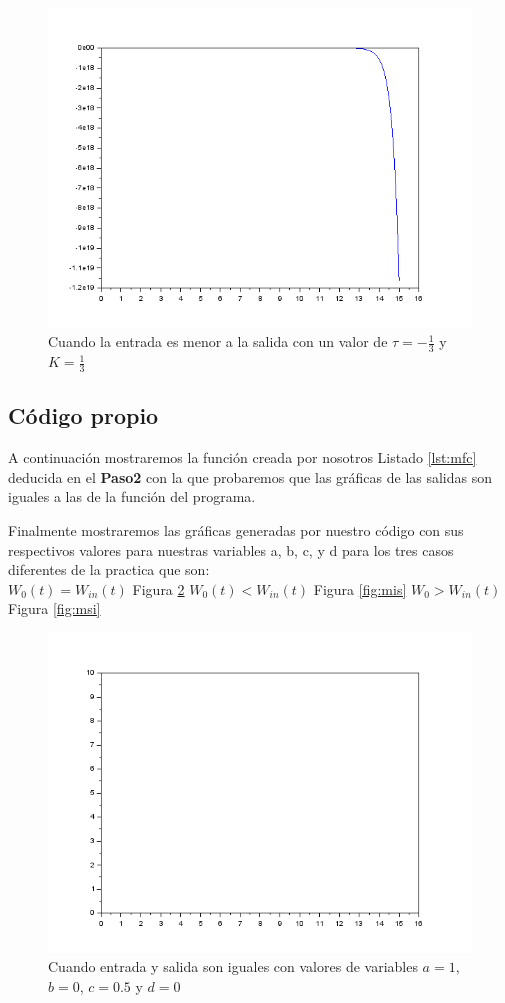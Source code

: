 \documentclass[letterpaper,10pt]{article}
\begin{document}
 \begin{figure}[h!]
 	\centering
 	\includegraphics[width=0.5\linewidth]{salin}
 	\caption{Cuando la entrada es menor a la salida con un valor de $\tau=-\frac{1}{3}$ y $K=\frac{1}{3}$}
 	\label{fig:salin}
 \end{figure}
 \FloatBarrier 
\subsection{Código propio}
A continuación mostraremos la función creada por nosotros Listado \ref{lst:mfc} deducida en el \textbf{Paso2} con la que probaremos que las gráficas de las salidas son iguales a las de la función del programa.
	 

Finalmente mostraremos las gráficas generadas por nuestro código con sus respectivos valores para nuestras variables a, b, c, y d  para los tres casos diferentes de la practica que son:\\
$W_0(t)=W_{in}(t)$ Figura \ref{fig:miql} $W_0(t)<W_{in}(t)$ Figura \ref{fig:mis} $W_0>W_{in}(t)$ Figura \ref{fig:msi}

\begin{figure}[h!]
	\centering
	\includegraphics[width=0.5\linewidth]{miql}
	\caption{Cuando entrada y salida son iguales con valores de variables $a=1$, $b=0$, $c=0.5$ y $d=0$}
	\label{fig:miql}
\end{figure}
\end{document}
